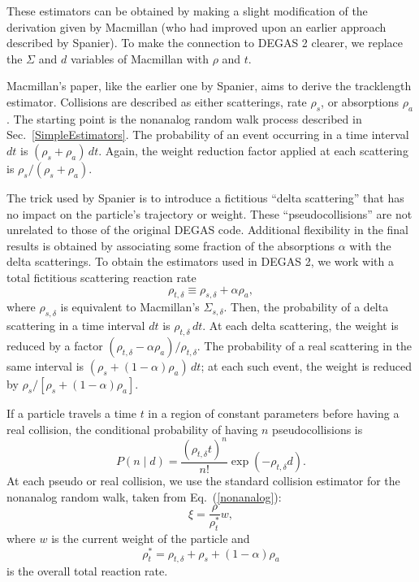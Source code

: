 \documentclass[12pt]{report}
\begin{document}
These estimators can be obtained by making a slight modification of the
derivation given by Macmillan\cite{Macm67} (who had improved upon an
earlier approach described by Spanier\cite{Span66}). To make the connection
to DEGAS 2 clearer, we replace the $\Sigma$ and $d$ variables of Macmillan
with $\rho$ and $t$.

Macmillan's paper, like the earlier one by Spanier, aims to derive the 
tracklength estimator. Collisions are described as either
scatterings, rate $\rho_{s}$, or absorptions $\rho_{a}$. The 
starting point is the nonanalog random walk process described in
Sec.~\ref{SimpleEstimators}. The probability of an event occurring in
a time interval $dt$ is $(\rho_{s} + \rho_{a}) \, dt$. Again, the weight
reduction factor applied at each scattering 
is $\rho_{s} / (\rho_{s} + \rho_{a})$.

The trick used by Spanier is to introduce a fictitious ``delta scattering''
that has no impact on the particle's trajectory or weight. These
``pseudocollisions'' are not unrelated to those of the original
DEGAS code\cite{Heif82}. Additional flexibility in the final results is 
obtained by associating some fraction of the absorptions $\alpha$ with
the delta scatterings. To obtain the estimators used in DEGAS 2, we
work with a total fictitious scattering reaction rate
\begin{equation}
\rho_{t,\delta} \equiv \rho_{s,\delta} + \alpha \rho_{a},
\end{equation}
where $\rho_{s,\delta}$ is equivalent to Macmillan's $\Sigma_{s,\delta}$.
Then, the probability of a delta scattering in a time interval $dt$ is
$\rho_{t,\delta} \, dt$. At each delta scattering, the weight is
reduced by a factor $(\rho_{t,\delta} - \alpha \rho_{a}) / \rho_{t,\delta}$.
The probability of a real scattering in the same interval is
$(\rho_{s} + (1 - \alpha) \rho_{a}) \, dt$; at each such event, the
weight is reduced by $\rho_{s} / [\rho_{s} + (1 - \alpha) \rho_{a}]$.

If a particle travels a time $t$ in a region of constant parameters
before having a real collision, the conditional probability of having
$n$ pseudocollisions is
\begin{equation}
P(n \mid d) = \frac{ ( \rho_{t,\delta} t)^{n}}{n!} \exp(- \rho_{t,\delta} d).
\end{equation}
At each pseudo or real collision, we use the standard collision estimator
for the nonanalog random walk, taken from Eq.~(\ref{nonanalog}):
\begin{equation}
\xi = \frac{\rho}{\rho_{t}^{\ast}} w,
\end{equation}
where $w$ is the current weight of the particle and
\begin{equation}
\rho_{t}^{\ast} = \rho_{t,\delta} + \rho_{s} + (1 - \alpha) \rho_{a}
\end{equation}
is the overall total reaction rate.
\end{document}
